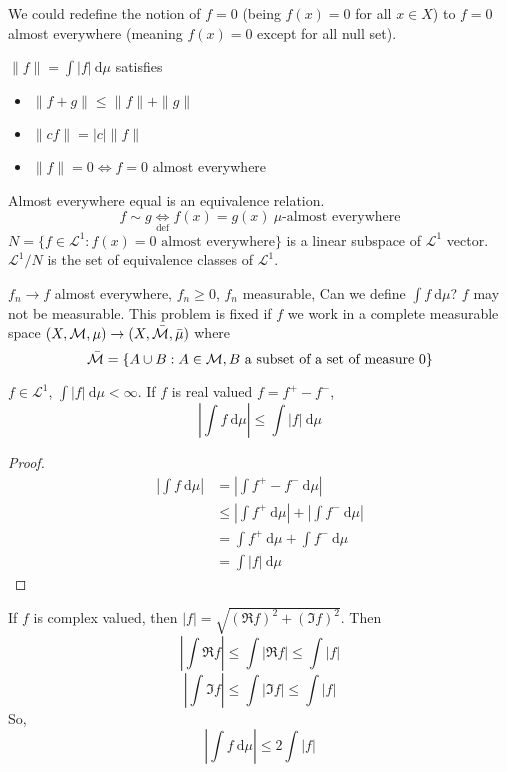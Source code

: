 We could redefine the notion of $f=0$ (being $f(x) = 0$ for all $x \in X$) to $f = 0$ almost everywhere (meaning $f(x) = 0$ except for all null set).


\begin{remark}
  $\|f\| = \int |f|\ \mathrm{d}\mu$ satisfies
  \begin{itemize}
    \item $\|f + g\| \le \|f\| + \|g\|$
    \item $\|c f\| = |c|\|f\|$
    \item $\|f\| = 0 \iff f = 0$ almost everywhere
  \end{itemize}
\end{remark}

\begin{remark}
  Almost everywhere equal is an equivalence relation.
  \[f \sim g \underset{\text{def}}\iff f(x) = g(x)\ \mu\text{-almost everywhere}\]
  $N = \{f \in\mathcal{L}^1 : f(x) = 0 \text{ almost everywhere}\}$ is a linear subspace of $\mathcal{L}^1$ vector.
  $\mathcal{L}^1/N$ is the set of equivalence classes of $\mathcal{L}^1$.
\end{remark}

$f_n \to f$ almost everywhere, $f_n \ge 0$, $f_n$ measurable, Can we define $\int f\ \mathrm{d}\mu$?
$f$ may not be measurable. This problem is fixed if $f$ we work in a complete measurable space
$(X, \mathcal M, \mu) \to (X, \bar{\mathcal M}, \bar{\mu})$
where 
\[\bar{\mathcal M} = \{A \cup B : A \in \mathcal M, B \text{ a subset of a set of measure }0\}\]

\begin{lemma}
$f \in \mathcal{L}^1$, $\int |f|\ \mathrm{d}\mu < \infty$. If $f$ is real valued $f = f^+ - f^-$,
\[\left|\int f\ \mathrm{d}\mu \right| \le \int |f| \ \mathrm{d}\mu\]
\end{lemma}
\begin{proof}
  \begin{align*}
    \left|\int f\ \mathrm{d}\mu \right| &= \left|\int f^+ - f^- \ \mathrm{d}\mu \right| \\
    &\le \left|\int f^+ \ \mathrm{d}\mu \right| + \left|\int f^- \ \mathrm{d}\mu \right| \\
    &= \int f^+ \ \mathrm{d}\mu + \int f^- \ \mathrm{d}\mu \\
    &= \int |f| \ \mathrm{d}\mu
  \end{align*}
\end{proof}

\begin{remark}
  If $f$ is complex valued, then $|f| = \sqrt{(\Re f)^2 + (\Im f)^2}$.
  Then
  \[\left|\int \Re f \right|\le \int |\Re f| \le \int |f|\]
  \[\left|\int \Im f \right|\le \int |\Im f| \le \int |f|\]
  So, 
  \[\left|\int f\ \mathrm{d}\mu \right| \le 2\int |f|\]
\end{remark}


